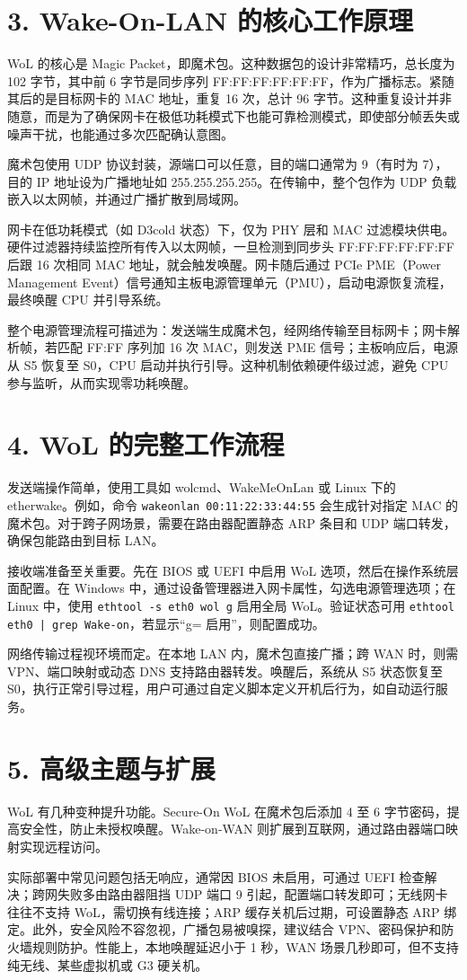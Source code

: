 \chapter{3. Wake-On-LAN 的核心工作原理}
WoL 的核心是 Magic Packet，即魔术包。这种数据包的设计非常精巧，总长度为 102 字节，其中前 6 字节是同步序列 FF:FF:FF:FF:FF:FF，作为广播标志。紧随其后的是目标网卡的 MAC 地址，重复 16 次，总计 96 字节。这种重复设计并非随意，而是为了确保网卡在极低功耗模式下也能可靠检测模式，即使部分帧丢失或噪声干扰，也能通过多次匹配确认意图。\par
魔术包使用 UDP 协议封装，源端口可以任意，目的端口通常为 9（有时为 7），目的 IP 地址设为广播地址如 255.255.255.255。在传输中，整个包作为 UDP 负载嵌入以太网帧，并通过广播扩散到局域网。\par
网卡在低功耗模式（如 D3cold 状态）下，仅为 PHY 层和 MAC 过滤模块供电。硬件过滤器持续监控所有传入以太网帧，一旦检测到同步头 FF:FF:FF:FF:FF:FF 后跟 16 次相同 MAC 地址，就会触发唤醒。网卡随后通过 PCIe PME（Power Management Event）信号通知主板电源管理单元（PMU），启动电源恢复流程，最终唤醒 CPU 并引导系统。\par
整个电源管理流程可描述为：发送端生成魔术包，经网络传输至目标网卡；网卡解析帧，若匹配 FF:FF 序列加 16 次 MAC，则发送 PME 信号；主板响应后，电源从 S5 恢复至 S0，CPU 启动并执行引导。这种机制依赖硬件级过滤，避免 CPU 参与监听，从而实现零功耗唤醒。\par
\chapter{4. WoL 的完整工作流程}
发送端操作简单，使用工具如 wolcmd、WakeMeOnLan 或 Linux 下的 etherwake。例如，命令 \texttt{wakeonlan 00:11:22:33:44:55} 会生成针对指定 MAC 的魔术包。对于跨子网场景，需要在路由器配置静态 ARP 条目和 UDP 端口转发，确保包能路由到目标 LAN。\par
接收端准备至关重要。先在 BIOS 或 UEFI 中启用 WoL 选项，然后在操作系统层面配置。在 Windows 中，通过设备管理器进入网卡属性，勾选电源管理选项；在 Linux 中，使用 \texttt{ethtool -s eth0 wol g} 启用全局 WoL。验证状态可用 \texttt{ethtool eth0 | grep Wake-on}，若显示“g= 启用”，则配置成功。\par
网络传输过程视环境而定。在本地 LAN 内，魔术包直接广播；跨 WAN 时，则需 VPN、端口映射或动态 DNS 支持路由器转发。唤醒后，系统从 S5 状态恢复至 S0，执行正常引导过程，用户可通过自定义脚本定义开机后行为，如自动运行服务。\par
\chapter{5. 高级主题与扩展}
WoL 有几种变种提升功能。Secure-On WoL 在魔术包后添加 4 至 6 字节密码，提高安全性，防止未授权唤醒。Wake-on-WAN 则扩展到互联网，通过路由器端口映射实现远程访问。\par
实际部署中常见问题包括无响应，通常因 BIOS 未启用，可通过 UEFI 检查解决；跨网失败多由路由器阻挡 UDP 端口 9 引起，配置端口转发即可；无线网卡往往不支持 WoL，需切换有线连接；ARP 缓存关机后过期，可设置静态 ARP 绑定。此外，安全风险不容忽视，广播包易被嗅探，建议结合 VPN、密码保护和防火墙规则防护。性能上，本地唤醒延迟小于 1 秒，WAN 场景几秒即可，但不支持纯无线、某些虚拟机或 G3 硬关机。\par

